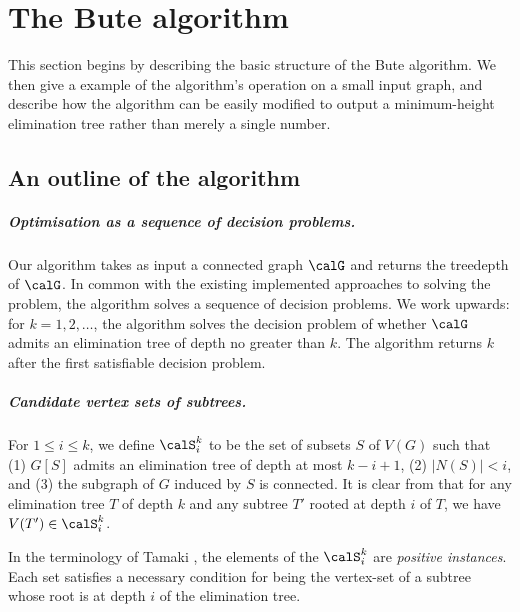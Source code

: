 \section{The Bute algorithm}\label{sec:algorithm}

This section begins by describing the basic structure of the Bute algorithm.  We then
give a example of the algorithm's operation on a small input graph, and describe how the
algorithm can be easily modified to output a minimum-height elimination tree rather than
merely a single number.

\subsection{An outline of the algorithm}

\subparagraph*{Optimisation as a sequence of decision problems.}
Our algorithm takes as input a connected graph $\calG$ and returns the treedepth of $\calG$.
In common with the existing implemented approaches to solving the problem, the algorithm solves
a sequence of decision problems.  We work upwards: for $k=1, 2,\dots$, the algorithm
solves the decision problem of whether $\calG$ admits an elimination tree of depth no greater than $k$.
The algorithm returns $k$ after the first satisfiable decision problem.

\subparagraph*{Candidate vertex sets of subtrees.}
For $1 \leq i \leq k$, we define
$\calS_i^k$ to be the set of subsets $S$ of $V(G)$ such that (1) $G[S]$ admits an elimination tree
of depth at most $k-i+1$, (2) $|N(S)| < i$, and (3) the subgraph of $G$ induced by $S$
is connected.
It is clear from  that for any elimination tree $T$ of depth
$k$ and any subtree $T'$ rooted at depth $i$ of $T$, we have $V(T') \in \calS_i^k$.

In the terminology of Tamaki \cite{DBLP:journals/jco/Tamaki19}, the elements of the
$\calS_i^k$ are \emph{positive instances}. Each set satisfies a necessary condition for
being the vertex-set of a subtree whose root is at depth $i$ of the elimination tree.


